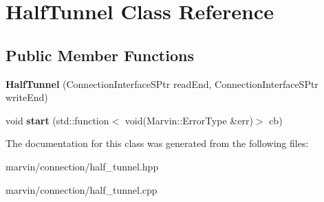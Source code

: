 \hypertarget{class_half_tunnel}{}\section{Half\+Tunnel Class Reference}
\label{class_half_tunnel}
\subsection*{Public Member Functions}
\begin{DoxyCompactItemize}
\item 
\mbox{\label{class_half_tunnel_a9c35eea93d40ca527eff75df00436ca4}} 
{\bfseries Half\+Tunnel} (Connection\+Interface\+S\+Ptr read\+End, Connection\+Interface\+S\+Ptr write\+End)
\item 
\mbox{\label{class_half_tunnel_a2023d6a71fa1e47873e254b6a1825594}} 
void {\bfseries start} (std\+::function$<$ void(Marvin\+::\+Error\+Type \&err)$>$ cb)
\end{DoxyCompactItemize}


The documentation for this class was generated from the following files\+:\begin{DoxyCompactItemize}
\item 
marvin/connection/half\+\_\+tunnel.\+hpp\item 
marvin/connection/half\+\_\+tunnel.\+cpp\end{DoxyCompactItemize}
